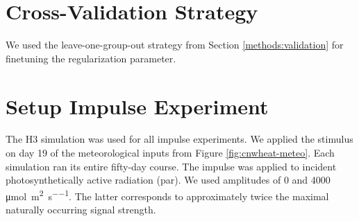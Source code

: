 
\section{Cross-Validation Strategy} \label{app:cnwheat-validation}

We used the leave-one-group-out strategy from Section \ref{methods:validation} for finetuning the regularization parameter.

\section{Setup Impulse Experiment} \label{app:cnwheat-impulse}

The H3 simulation was used for all impulse experiments.
We applied the stimulus on day 19 of the meteorological inputs from Figure \ref{fig:cnwheat-meteo}. 
Each simulation ran its entire fifty-day course.
The impulse was applied to incident photosynthetically active radiation (\acrshort{par}).
We used amplitudes of 0 and 4000 \unit{\micro\mole\per\square\metre\per\second}. 
The latter corresponds to approximately twice the maximal naturally occurring signal strength. 



